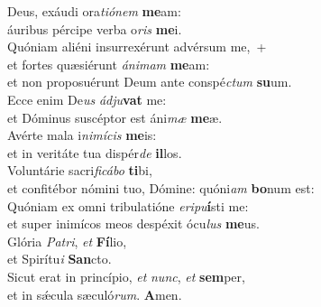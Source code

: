 \evenverse Deus, exáudi ora\textit{ti}\textit{ó}\textit{nem} \textbf{me}am:~\*\\
\evenverse áuribus pércipe verba o\textit{ris} \textbf{me}i.\\
\oddverse Quóniam aliéni insurrexérunt advérsum me,~+\\
\oddverse  et fortes quæsiérunt \textit{á}\textit{ni}\textit{mam} \textbf{me}am:~\*\\
\oddverse et non proposuérunt Deum ante conspé\textit{ctum} \textbf{su}um.\\
\evenverse Ecce enim De\textit{us} \textit{ád}\textit{ju}\textbf{vat} me:~\*\\
\evenverse et Dóminus suscéptor est áni\textit{mæ} \textbf{me}æ.\\
\oddverse Avérte mala i\textit{ni}\textit{mí}\textit{cis} \textbf{me}is:~\*\\
\oddverse et in veritáte tua dispér\textit{de} \textbf{il}los.\\
\evenverse Voluntárie sacri\textit{fi}\textit{cá}\textit{bo} \textbf{ti}bi,~\*\\
\evenverse et confitébor nómini tuo, Dómine: quóni\textit{am} \textbf{bo}num est:\\
\oddverse Quóniam ex omni tribulatióne \textit{e}\textit{ri}\textit{pu}\textbf{í}sti me:~\*\\
\oddverse et super inimícos meos despéxit ócu\textit{lus} \textbf{me}us.\\
\evenverse Glória \textit{Pa}\textit{tri}, \textit{et} \textbf{Fí}lio,~\*\\
\evenverse et Spirítu\textit{i} \textbf{San}cto.\\
\oddverse Sicut erat in princípio, \textit{et} \textit{nunc}, \textit{et} \textbf{sem}per,~\*\\
\oddverse et in sǽcula sæculó\textit{rum}. \textbf{A}men.\\
